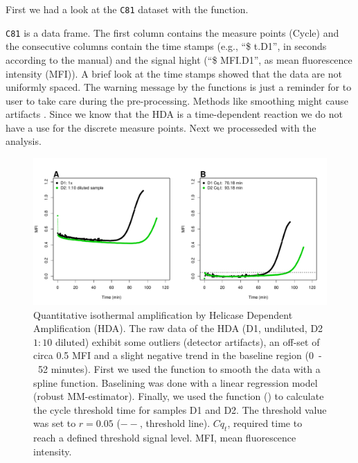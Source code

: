 First we had a look at the \texttt{C81} dataset with the  function.


\texttt{C81} is a data frame. The first column contains the measure points 
(Cycle) and the consecutive columns contain the time stamps (e.g., ``\$ t.D1'', 
in seconds according to the  manual) and the signal hight (``\$ 
MFI.D1'', as mean fluorescence intensity (MFI)). A brief look at the time stamps 
showed that the data are not uniformly spaced. The warning message by the 
 functions is just a reminder for to user to take care during the 
pre-processing. Methods like smoothing might cause artifacts 
\citep{Spiess_2014}. Since we know that the HDA is a time-dependent reaction we 
do not have a use for the discrete measure points. Next we processeded with the analysis. 

\begin{figure}[htbp]
  \centering
  \includegraphics[clip=true, trim=0.15cm 0.55cm 1cm 1.3cm, width=12cm]{figures/qIA.pdf}
  \caption{Quantitative isothermal amplification by Helicase Dependent 
Amplification (HDA).  The raw data of the HDA (D1, undiluted, D2 
$1:10$ diluted) exhibit some outliers (detector artifacts), an off-set of circa 
0.5 MFI and a slight negative trend in the 
baseline region (0~-~52 minutes).  First we used the  
function to smooth the data with a spline function. Baselining was done with a 
linear regression model (robust MM-estimator). Finally, we used the 
 function () to calculate the cycle threshold time 
for samples D1 and D2. The threshold value was set to $r = 0.05$ ($--$, 
threshold line). $Cq_{t}$, required time to reach a defined threshold signal 
level. MFI, mean fluorescence intensity.}
  \label{figure:qIA}
\end{figure}

